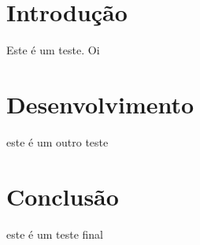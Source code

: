 






    \tableofcontents

    \section{Introdução}
        Este é um teste. Oi \cite{teste}

    \section{Desenvolvimento}
        este é um outro teste
    
    \section{Conclusão}
        este é um teste final
    
   
    \printbibliography[title=Referências Bibliográficas]
        



